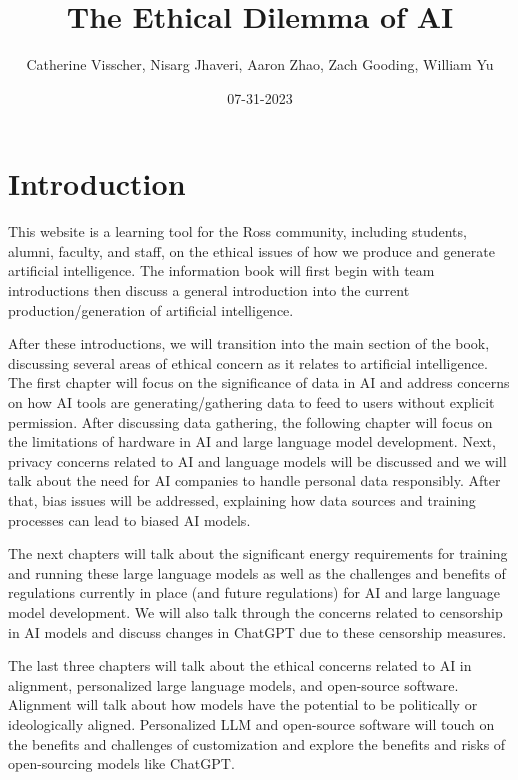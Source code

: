 \documentclass[
]{book}
\title{The Ethical Dilemma of AI}
\author{Catherine Visscher, Nisarg Jhaveri, Aaron Zhao, Zach Gooding, William Yu}
\date{07-31-2023}
\begin{document}
\maketitle

{
\setcounter{tocdepth}{1}
\tableofcontents
}
\hypertarget{introduction}{%
\chapter{Introduction}\label{introduction}}

This website is a learning tool for the Ross community, including students, alumni, faculty, and staff, on the ethical issues of how we produce and generate artificial intelligence. The information book will first begin with team introductions then discuss a general introduction into the current production/generation of artificial intelligence.

After these introductions, we will transition into the main section of the book, discussing several areas of ethical concern as it relates to artificial intelligence. The first chapter will focus on the significance of data in AI and address concerns on how AI tools are generating/gathering data to feed to users without explicit permission. After discussing data gathering, the following chapter will focus on the limitations of hardware in AI and large language model development. Next, privacy concerns related to AI and language models will be discussed and we will talk about the need for AI companies to handle personal data responsibly. After that, bias issues will be addressed, explaining how data sources and training processes can lead to biased AI models.

The next chapters will talk about the significant energy requirements for training and running these large language models as well as the challenges and benefits of regulations currently in place (and future regulations) for AI and large language model development. We will also talk through the concerns related to censorship in AI models and discuss changes in ChatGPT due to these censorship measures.

The last three chapters will talk about the ethical concerns related to AI in alignment, personalized large language models, and open-source software. Alignment will talk about how models have the potential to be politically or ideologically aligned. Personalized LLM and open-source software will touch on the benefits and challenges of customization and explore the benefits and risks of open-sourcing models like ChatGPT.
\end{document}
